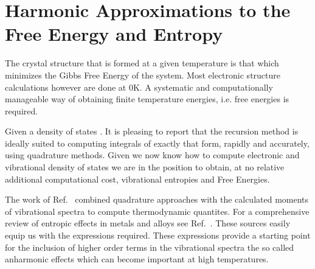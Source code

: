 \section{Harmonic Approximations to the Free Energy and Entropy}
The crystal structure that is formed at a given temperature is that which
minimizes the Gibbs Free Energy of the system. Most electronic structure calculations
however are done at 0K. A systematic and computationally manageable way of obtaining
finite temperature energies, i.e. free energies is required.

Given a density of states . It is pleasing to report that the recursion method
is ideally suited to computing integrals of exactly that form, rapidly and accurately,
using quadrature methods. Given we now know how to compute electronic and 
vibrational density of states we are in the position to obtain, at no relative additional 
computational cost, vibrational entropies and Free Energies.

The work of Ref.~\cite{wheeler68} combined quadrature approaches
with the calculated moments of vibrational spectra to compute
thermodynamic quantites. For a comprehensive review
of entropic effects in metals and alloys see Ref.~\cite{fultz10}. 
These sources easily equip us with the expressions required. These expressions provide a starting
point for the inclusion of higher order terms in the vibrational spectra
the so called anharmonic effects which can become important at high temperatures.
